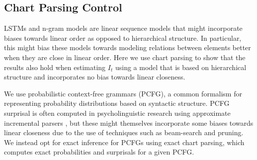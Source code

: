 \documentclass[11pt,letterpaper]{article}
\begin{document}
%
%
%
%
%
%

\subsection{Chart Parsing Control}

LSTMs and n-gram models are linear sequence models that might incorporate biases towards linear order as opposed to hierarchical structure.
In particular, this might bias these models towards modeling relations between elements better when they are close in linear order.
Here we use chart parsing to show that the results also hold when estimating $I_t$ using a model that is based on hierarchical structure and incorporates no bias towards linear closeness.

We use probabilistic context-free grammars (PCFG), a common formalism for representing probability distributions based on syntactic structure.
PCFG surprisal is often computed in psycholinguistic research using approximate incremental parsers \citep{DBLP:journals/coling/Roark01,DBLP:journals/coling/DembergKK13,DBLP:journals/topics/SchijndelES13}, but these might themselves incorporate some biases towards linear closeness due to the use of techniques such as beam-search and pruning.
We instead opt for exact inference for PCFGs using exact chart parsing, which computes exact probabilities and surprisals for a given PCFG.
\end{document}
